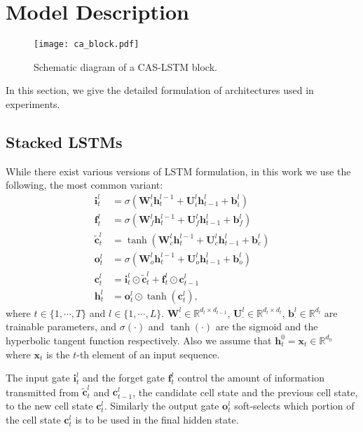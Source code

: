 \documentclass[wcp]{jmlr}
\begin{document}
    
    \section{Model Description}
    \label{sec:caslstm}
    
    \begin{figure}[tb]
        \centering
        \texttt{[image: ca\_block.pdf]}
        \caption{Schematic diagram of a CAS-LSTM block.}
        \label{fig:diagram}
    \end{figure}
    
    In this section, we give the detailed formulation of architectures used in experiments.
    \subsection{Stacked LSTMs}
    \label{ssec:stacked-lstm}
    While there exist various versions of LSTM formulation, in this work we use the following, the most common variant:
    \begin{align}
    \mathbf{i}_t^l &= \sigma(\mathbf{W}_i^l \mathbf{h}_t^{l-1} + \mathbf{U}_i^l \mathbf{h}_{t-1}^l + \mathbf{b}_i^l) \\
    \mathbf{f}_t^l &= \sigma(\mathbf{W}_f^l \mathbf{h}_t^{l-1} + \mathbf{U}_f^l \mathbf{h}_{t-1}^l + \mathbf{b}_f^l) \\
    \tilde{\mathbf{c}}_t^l &= \tanh(\mathbf{W}_c^l \mathbf{h}_t^{l-1} + \mathbf{U}_c^l \mathbf{h}_{t-1}^l + \mathbf{b}_c^l) \\
    \mathbf{o}_t^l &= \sigma(\mathbf{W}_o^l \mathbf{h}_t^{l-1} + \mathbf{U}_o^l \mathbf{h}_{t-1}^l + \mathbf{b}_o^l) \\
    \mathbf{c}_t^l &= \mathbf{i}_t^l \odot \tilde{\mathbf{c}}_t^l + \mathbf{f}_t^l \odot \mathbf{c}_{t-1}^l \label{eq:conventional-cell}\\
    \mathbf{h}_t^l &= \mathbf{o}_t^l \odot \tanh(\mathbf{c}_t^l),
    \end{align}
    where $t \in \{1,\cdots,T\}$ and $l \in \{1,\cdots,L\}$. $\mathbf{W}_{\cdot}^{l} \in \mathbb{R}^{d_l \times d_{l-1}}$, $\mathbf{U}_{\cdot}^{l} \in \mathbb{R}^{d_l \times d_l}$, $\mathbf{b}_{\cdot}^{l} \in \mathbb{R}^{d_l}$ are trainable parameters,
    and $\sigma(\cdot)$ and $\tanh(\cdot)$ are the sigmoid and the hyperbolic tangent function respectively.
    Also we assume that $\mathbf{h}_t^0=\mathbf{x}_t \in \mathbb{R}^{d_0}$ where $\mathbf{x}_t$ is the $t$-th element of an input sequence.
    
    The input gate $\mathbf{i}_t^l$ and the forget gate $\mathbf{f}_t^l$ control the amount of information transmitted from $\tilde{\mathbf{c}}_t^l$ and $\mathbf{c}_{t-1}^l$, the candidate cell state and the previous cell state, to the new cell state $\mathbf{c}_t^l$.
    Similarly the output gate $\mathbf{o}_t^l$ soft-selects which portion of the cell state $\mathbf{c}_t^l$ is to be used in the final hidden state.
    
\end{document}
